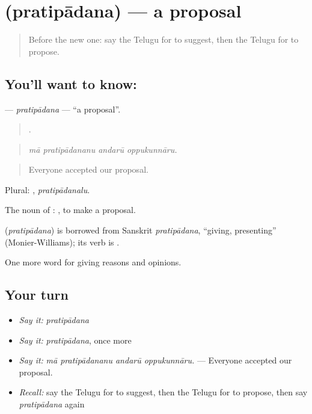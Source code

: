 \section[\texorpdfstring{\te{ప్రతిపాదన} (pratipādana)}{ప్రతిపాదన (pratipādana)}]{ (pratipādana) — a proposal}

\label{lesson:TE-C384-pratipadana}



\begin{quote}
Before the new one: say the Telugu for to suggest, then the Telugu for to propose.
\end{quote}

\subsection*{You'll want to know: }
\textbf{} — \emph{pratipādana} — \textquotedblleft{}a proposal\textquotedblright{}.

\begin{quote}
   .
\end{quote}

\begin{quote}
\emph{mā pratipādananu andarū oppukunnāru.}
\end{quote}

\begin{quote}
Everyone accepted our proposal.
\end{quote}

Plural: , \emph{pratipādanalu}.

The noun of :   , to make a proposal.

\begin{cousinweb}
\textbf{} (\emph{pratipādana}) is borrowed from Sanskrit \emph{pratipādana}, \textquotedblleft{}giving, presenting\textquotedblright{} (Monier-Williams); its verb is .
\end{cousinweb}

\begin{grammarlens}[title={What you've built}]
One more word for giving reasons and opinions.
\end{grammarlens}

\subsection*{Your turn}
\begin{itemize}
\raggedright
  \item \emph{Say it:} \emph{pratipādana}
  \item \emph{Say it:} \emph{pratipādana}, once more
  \item \emph{Say it:} \emph{mā pratipādananu andarū oppukunnāru.} — Everyone accepted our proposal.
  \item \emph{Recall:} say the Telugu for to suggest, then the Telugu for to propose, then say \emph{pratipādana} again
\end{itemize}

